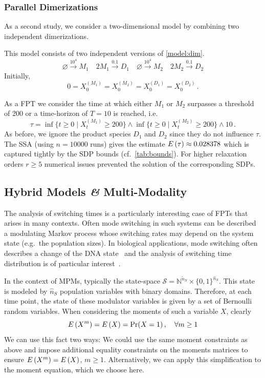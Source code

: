 \subsubsection*{Parallel Dimerizations}
As a second study, we consider a two-dimensional model by combining two
independent dimerizations.
\begin{model}\label{model:double_dim} This model consists of two independent versions of \autoref{model:dim}.
	\[
		\varnothing\xrightarrow{10^4}M_1\quad 2M_1\xrightarrow{0.1}D_1\quad \varnothing\xrightarrow{10^4}M_2\quad 2M_2\xrightarrow{0.1}D_2
	\]
	Initially, \[0=X_0^{(M_1)}=X_0^{(M_2)}=X_0^{(D_1)}=X_0^{(D_2)}\,.\]
\end{model}
As a \ac{FPT} we consider the time at which either $M_1$ or $M_2$ surpasses a threshold of \num{200} or a time-horizon of $T=10$
is reached, i.e.
\[ \tau=\inf\{t\geq 0\mid X_t^{(M_1)} \geq 200\}\land \inf\{t\geq 0\mid X_t^{(M_2)} \geq 200\}\land 10\,.
\]
As before, we ignore the product species $D_1$ and $D_2$ since they do not influence $\tau$.
The \ac{SSA}   (using $n=\num{10000}$ runs) gives the estimate ${E}\left(\tau\right)\approx {0.028378}$ %
which is captured tightly by the \ac{SDP} bounds (cf.\ \autoref{tab:bounds}).
For higher relaxation orders $r \geq 5$  numerical issues prevented the solution of the
corresponding \acp{SDP}.

\subsection{Hybrid Models \textit{\&} Multi-Modality}
The analysis of switching times is a particularly interesting case of \acp{FPT} that
arises in many   contexts.
Often mode switching in such systems can be described a modulating Markov process
whose switching rates may depend on the system state (e.g.\ the population sizes).
In biological applications, mode switching often describes a change of the
\acs{DNA} state~\parencite{hasenauer2014method,stekel2008strong} and the analysis of
switching time distribution is of particular interest~\parencite{spieler2014model,barzel2008calculation}.

In the context of \acp{MPM}, typically the state-space $\mathcal{S}=
\mathbb{N}^{\tilde{n}_S}\times {\{0,1\}}^{\hat{n}_S}$.
This state is modeled by  $\hat{n}_S$ population variables with
binary domains. Therefore, at each time point, the state of these modulator variables
is given by a set of Bernoulli random variables.
When considering the moments of
such a variable $X$, clearly
\[
	{E}\left(X^m\right)={E}\left(X\right)=\Pr(X=1)\,,\quad \forall m\geq 1
\]
We can use this fact two ways: We could use the same moment
constraints
as above and impose additional equality constraints on the moments matrices
to ensure ${E}\left(X^m\right)={E}\left(X\right)$, $m\geq 1$.
Alternatively, we can apply this simplification to the moment equation, which we choose here.

